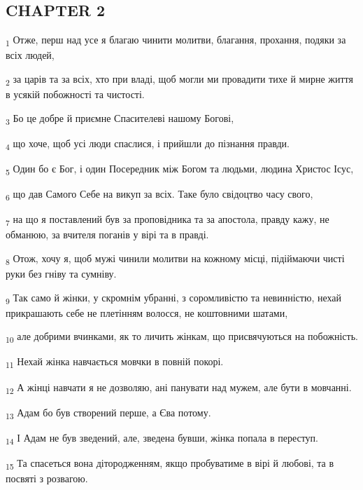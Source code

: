 \subsection{CHAPTER 2}
\begin{tcolorbox}
\textsubscript{1} Отже, перш над усе я благаю чинити молитви, благання, прохання, подяки за всіх людей,
\end{tcolorbox}
\begin{tcolorbox}
\textsubscript{2} за царів та за всіх, хто при владі, щоб могли ми провадити тихе й мирне життя в усякій побожності та чистості.
\end{tcolorbox}
\begin{tcolorbox}
\textsubscript{3} Бо це добре й приємне Спасителеві нашому Богові,
\end{tcolorbox}
\begin{tcolorbox}
\textsubscript{4} що хоче, щоб усі люди спаслися, і прийшли до пізнання правди.
\end{tcolorbox}
\begin{tcolorbox}
\textsubscript{5} Один бо є Бог, і один Посередник між Богом та людьми, людина Христос Ісус,
\end{tcolorbox}
\begin{tcolorbox}
\textsubscript{6} що дав Самого Себе на викуп за всіх. Таке було свідоцтво часу свого,
\end{tcolorbox}
\begin{tcolorbox}
\textsubscript{7} на що я поставлений був за проповідника та за апостола, правду кажу, не обманюю, за вчителя поганів у вірі та в правді.
\end{tcolorbox}
\begin{tcolorbox}
\textsubscript{8} Отож, хочу я, щоб мужі чинили молитви на кожному місці, підіймаючи чисті руки без гніву та сумніву.
\end{tcolorbox}
\begin{tcolorbox}
\textsubscript{9} Так само й жінки, у скромнім убранні, з соромливістю та невинністю, нехай прикрашають себе не плетінням волосся, не коштовними шатами,
\end{tcolorbox}
\begin{tcolorbox}
\textsubscript{10} але добрими вчинками, як то личить жінкам, що присвячуються на побожність.
\end{tcolorbox}
\begin{tcolorbox}
\textsubscript{11} Нехай жінка навчається мовчки в повній покорі.
\end{tcolorbox}
\begin{tcolorbox}
\textsubscript{12} А жінці навчати я не дозволяю, ані панувати над мужем, але бути в мовчанні.
\end{tcolorbox}
\begin{tcolorbox}
\textsubscript{13} Адам бо був створений перше, а Єва потому.
\end{tcolorbox}
\begin{tcolorbox}
\textsubscript{14} І Адам не був зведений, але, зведена бувши, жінка попала в переступ.
\end{tcolorbox}
\begin{tcolorbox}
\textsubscript{15} Та спасеться вона дітородженням, якщо пробуватиме в вірі й любові, та в посвяті з розвагою.
\end{tcolorbox}
